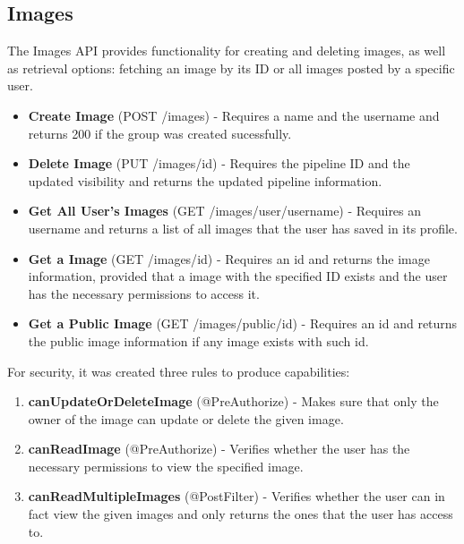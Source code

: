 \documentclass[acmart, nonacm]{acmart}
\begin{document}
\subsection{Images}
The Images API provides functionality for creating and deleting images, as well as retrieval options: fetching an image by its ID or all images posted by a specific user.
\begin{itemize}
    \item \textbf{Create Image} (POST /images) - Requires a name and the username and returns 200 if the group was created sucessfully.
    \item \textbf{Delete Image} (PUT /images/{id}) - Requires the pipeline ID and the updated visibility and returns the updated pipeline information.
    \item \textbf{Get All User's Images} (GET /images/user/{username}) - Requires an username and returns a list of all images that the user has saved in its profile.
    \item \textbf{Get a Image} (GET /images/{id}) - Requires an id and returns the image information, provided that a image with the specified ID exists and the user has the 
    necessary permissions to access it.
    \item \textbf{Get a Public Image} (GET /images/public/{id}) - Requires an id and returns the public image information if any image exists with such id.
\end{itemize}

For security, it was created three rules to produce capabilities:
\begin{enumerate}
    \item \textbf{canUpdateOrDeleteImage} (@PreAuthorize) - Makes sure that only the owner of the image can update or delete the given image.
    \item \textbf{canReadImage} (@PreAuthorize) - Verifies whether the user has the necessary permissions to view the specified image.
    \item \textbf{canReadMultipleImages} (@PostFilter) - Verifies whether the user can in fact view the given images and only returns the ones that the user has access to.
\end{enumerate}
\end{document}
